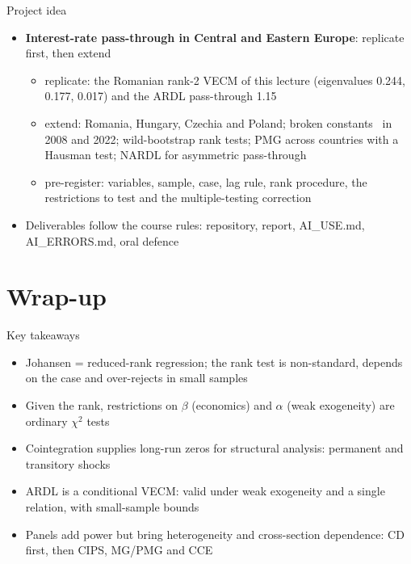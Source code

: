 \begin{frame}{Project idea}
\itemsize{\small}
\begin{itemize}
    \item \textbf{Interest-rate pass-through in Central and Eastern Europe}: replicate first, then extend
    \begin{itemize}
        \item replicate: the Romanian rank-2 VECM of this lecture (eigenvalues 0.244, 0.177, 0.017) and the ARDL pass-through 1.15
        \item extend: Romania, Hungary, Czechia and Poland; broken constants \ in 2008 and 2022; wild-bootstrap rank tests; PMG across countries with a Hausman test; NARDL for asymmetric pass-through
        \item pre-register: variables, sample, case, lag rule, rank procedure, the restrictions to test and the multiple-testing correction
    \end{itemize}
    \item Deliverables follow the course rules: repository, report, AI\_USE.md, AI\_ERRORS.md, oral defence
\end{itemize}
\end{frame}


\section{Wrap-up}

\begin{frame}{Key takeaways}
\itemsize{\small}
\begin{itemize}
    \item Johansen = reduced-rank regression; the rank test is non-standard, depends on the case and over-rejects in small samples
    \item Given the rank, restrictions on $\beta$ (economics) and $\alpha$ (weak exogeneity) are ordinary $\chi^2$ tests
    \item Cointegration supplies long-run zeros for structural analysis: permanent and transitory shocks
    \item ARDL is a conditional VECM: valid under weak exogeneity and a single relation, with small-sample bounds
    \item Panels add power but bring heterogeneity and cross-section dependence: CD first, then CIPS, MG/PMG and CCE
\end{itemize}
\end{frame}

